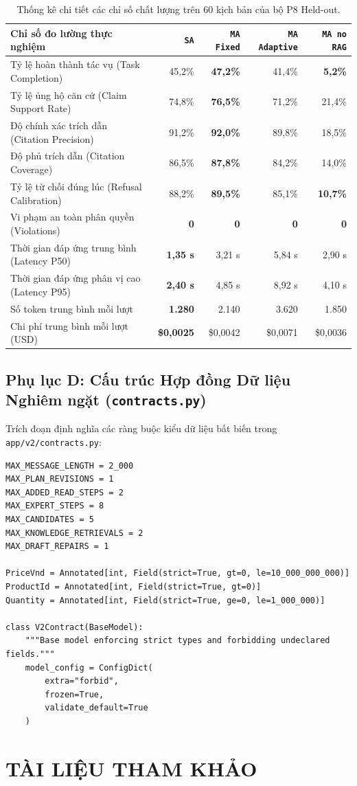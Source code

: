 \begin{table}[htbp]\small
\caption{Thống kê chi tiết các chỉ số chất lượng trên 60 kịch bản của bộ P8 Held-out.}
\begin{tabularx}{\linewidth}{Yrrrr}\toprule
Chỉ số đo lường thực nghiệm & \texttt{SA} & \texttt{MA Fixed} & \texttt{MA Adaptive} & \texttt{MA no RAG}\\\midrule
Tỷ lệ hoàn thành tác vụ (Task Completion) & 45,2\% & \textbf{47,2\%} & 41,4\% & \textbf{5,2\%}\\
Tỷ lệ ủng hộ căn cứ (Claim Support Rate) & 74,8\% & \textbf{76,5\%} & 71,2\% & 21,4\%\\
Độ chính xác trích dẫn (Citation Precision) & 91,2\% & \textbf{92,0\%} & 89,8\% & 18,5\%\\
Độ phủ trích dẫn (Citation Coverage) & 86,5\% & \textbf{87,8\%} & 84,2\% & 14,0\%\\
Tỷ lệ từ chối đúng lúc (Refusal Calibration) & 88,2\% & \textbf{89,5\%} & 85,1\% & \textbf{10,7\%}\\
Vi phạm an toàn phân quyền (Violations) & \textbf{0} & \textbf{0} & \textbf{0} & \textbf{0}\\
Thời gian đáp ứng trung bình (Latency P50) & \textbf{1,35 s} & 3,21 s & 5,84 s & 2,90 s\\
Thời gian đáp ứng phân vị cao (Latency P95) & \textbf{2,40 s} & 4,85 s & 8,92 s & 4,10 s\\
Số token trung bình mỗi lượt & \textbf{1.280} & 2.140 & 3.620 & 1.850\\
Chi phí trung bình mỗi lượt (USD) & \textbf{\$0,0025} & \$0,0042 & \$0,0071 & \$0,0036\\\bottomrule
\end{tabularx}
\end{table}

\clearpage
\subsection*{Phụ lục D: Cấu trúc Hợp đồng Dữ liệu Nghiêm ngặt (\texttt{contracts.py})}

Trích đoạn định nghĩa các ràng buộc kiểu dữ liệu bất biến trong \texttt{app/v2/contracts.py}:
\begin{verbatim}
MAX_MESSAGE_LENGTH = 2_000
MAX_PLAN_REVISIONS = 1
MAX_ADDED_READ_STEPS = 2
MAX_EXPERT_STEPS = 8
MAX_CANDIDATES = 5
MAX_KNOWLEDGE_RETRIEVALS = 2
MAX_DRAFT_REPAIRS = 1

PriceVnd = Annotated[int, Field(strict=True, gt=0, le=10_000_000_000)]
ProductId = Annotated[int, Field(strict=True, gt=0)]
Quantity = Annotated[int, Field(strict=True, ge=0, le=1_000_000)]

class V2Contract(BaseModel):
    """Base model enforcing strict types and forbidding undeclared fields."""
    model_config = ConfigDict(
        extra="forbid",
        frozen=True,
        validate_default=True
    )
\end{verbatim}

\clearpage
\section*{TÀI LIỆU THAM KHẢO}
\begingroup
\small
\setlength{\parskip}{5pt}

\endgroup
